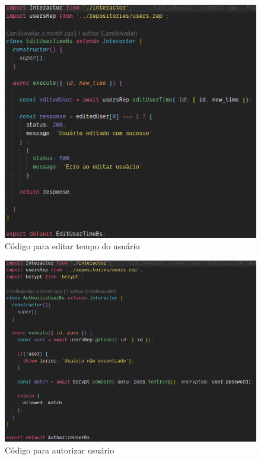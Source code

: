 \begin{figure}[htbp]
	\centering
	\includegraphics[width=1\linewidth]{figuras/userservice/edittime.png}
	\caption{Código para editar tempo do usuário}
	\label{fig:edittime}
\end{figure}

\begin{figure}[htbp]
	\centering
	\includegraphics[width=1\linewidth]{figuras/userservice/authorizeuser.png}
	\caption{Código para autorizar usuário}
	\label{fig:autorizar}
\end{figure}

